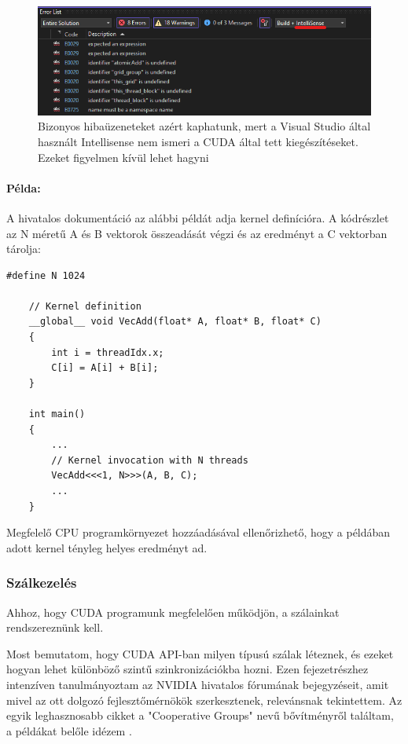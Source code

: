 \begin{figure}[ht!]
	\centering
	\includegraphics[width=150mm, keepaspectratio] {figures/invalidIntellisenseErrorMessages.png}
	\caption{Bizonyos hibaüzeneteket azért kaphatunk, mert a Visual Studio által használt Intellisense nem ismeri a CUDA által tett kiegészítéseket. Ezeket figyelmen kívül lehet hagyni \label{invalidErrors} }
\end{figure}

\paragraph{Példa:} A hivatalos dokumentáció az alábbi példát adja kernel definícióra. A kódrészlet az N méretű A és B vektorok összeadását végzi és az eredményt a C vektorban tárolja:

\begin{lstlisting}[style=CStyle,showstringspaces=false]
	#define N 1024
	
	// Kernel definition
	__global__ void VecAdd(float* A, float* B, float* C)
	{
		int i = threadIdx.x;
		C[i] = A[i] + B[i];
	}
	
	int main()
	{
		...
		// Kernel invocation with N threads
		VecAdd<<<1, N>>>(A, B, C);
		...
	}
\end{lstlisting}

Megfelelő CPU programkörnyezet hozzáadásával ellenőrizhető, hogy a példában adott kernel tényleg helyes eredményt ad.

\subsubsection{Szálkezelés}
Ahhoz, hogy CUDA programunk megfelelően működjön, a szálainkat rendszereznünk kell. 

Most bemutatom, hogy CUDA API-ban milyen típusú szálak léteznek, és ezeket hogyan lehet különböző szintű szinkronizációkba hozni. Ezen fejezetrészhez intenzíven tanulmányoztam az NVIDIA hivatalos fórumának bejegyzéseit, amit mivel az ott dolgozó fejlesztőmérnökök szerkesztenek, relevánsnak tekintettem. Az egyik leghasznosabb cikket a "Cooperative Groups" nevű bővítményről találtam, a példákat belőle idézem \cite{CUDAcoopgroups}.

